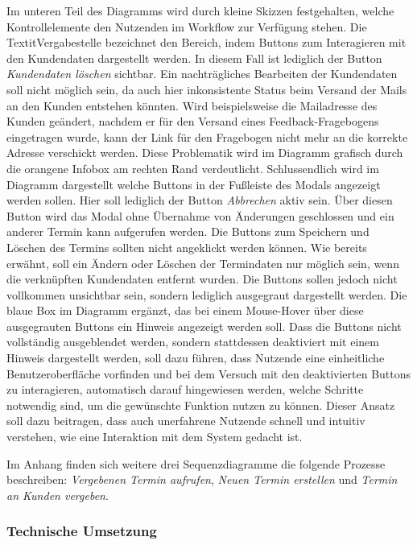 \documentclass[12pt]{article}
\begin{document}
Im unteren Teil des Diagramms wird durch kleine Skizzen festgehalten, welche
Kontrollelemente den Nutzenden im Workflow zur Verfügung stehen. Die
Textit{Vergabestelle} bezeichnet den Bereich, indem Buttons zum Interagieren
mit den Kundendaten dargestellt werden. In diesem Fall ist lediglich der Button
\textit{Kundendaten löschen} sichtbar. Ein nachträgliches Bearbeiten der
Kundendaten soll nicht möglich sein, da auch hier inkonsistente Status beim
Versand der Mails an den Kunden entstehen könnten. Wird beispielsweise die
Mailadresse des Kunden geändert, nachdem er für den Versand eines
Feedback-Fragebogens eingetragen wurde, kann der Link für den Fragebogen nicht
mehr an die korrekte Adresse verschickt werden. Diese Problematik wird im
Diagramm grafisch durch die orangene Infobox am rechten Rand verdeutlicht.
Schlussendlich wird im Diagramm dargestellt welche Buttons in der Fußleiste des
Modals angezeigt werden sollen. Hier soll lediglich der Button
\textit{Abbrechen} aktiv sein. Über diesen Button wird das Modal ohne Übernahme
von Änderungen geschlossen und ein anderer Termin kann aufgerufen werden. Die
Buttons zum Speichern und Löschen des Termins sollten nicht angeklickt werden
können. Wie bereits erwähnt, soll ein Ändern oder Löschen der Termindaten nur
möglich sein, wenn die verknüpften Kundendaten entfernt wurden. Die Buttons
sollen jedoch nicht vollkommen unsichtbar sein, sondern lediglich ausgegraut
dargestellt werden. Die blaue Box im Diagramm ergänzt, das bei einem
Mouse-Hover über diese ausgegrauten Buttons ein Hinweis angezeigt werden soll.
Dass die Buttons nicht vollständig ausgeblendet werden, sondern stattdessen
deaktiviert mit einem Hinweis dargestellt werden, soll dazu führen, dass
Nutzende eine einheitliche Benutzeroberfläche vorfinden und bei dem Versuch mit
den deaktivierten Buttons zu interagieren, automatisch darauf hingewiesen
werden, welche Schritte notwendig sind, um die gewünschte Funktion nutzen zu
können. Dieser Ansatz soll dazu beitragen, dass auch unerfahrene Nutzende
schnell und intuitiv verstehen, wie eine Interaktion mit dem System gedacht
ist.

Im Anhang  finden sich weitere drei Sequenzdiagramme
die folgende Prozesse beschreiben: \textit{Vergebenen Termin aufrufen},
\textit{Neuen Termin erstellen} und \textit{Termin an Kunden
    vergeben}.

\subsubsection{Technische Umsetzung}
\end{document}
